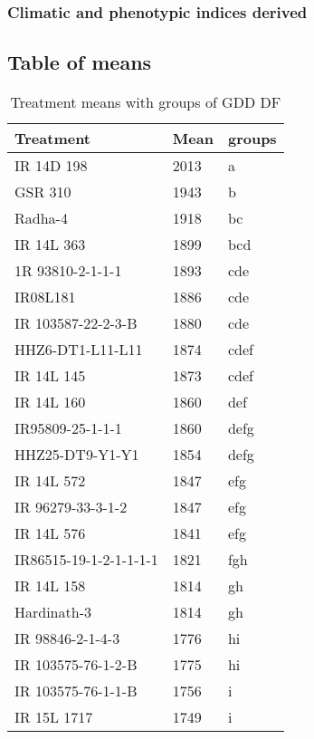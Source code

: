 \documentclass[]{article}
\begin{document}
\subsubsection{Climatic and phenotypic indices
derived}\label{climatic-and-phenotypic-indices-derived}

\subsection{Table of means}\label{table-of-means-1}

\begingroup\fontsize{12}{14}\selectfont

\begin{longtable}{lll}
\caption{\label{tab:two-fac-groups-tab-agroclimate-early}Treatment means with groups of GDD DF}\\
\toprule
Treatment & Mean & groups\\
\midrule
\rowcolor{gray!6}  IR 14D 198 & 2013 & a\\
GSR 310 & 1943 & b\\
\rowcolor{gray!6}  Radha-4 & 1918 & bc\\
IR 14L 363 & 1899 & bcd\\
\rowcolor{gray!6}  1R 93810-2-1-1-1 & 1893 & cde\\
\addlinespace
IR08L181 & 1886 & cde\\
\rowcolor{gray!6}  IR 103587-22-2-3-B & 1880 & cde\\
HHZ6-DT1-L11-L11 & 1874 & cdef\\
\rowcolor{gray!6}  IR 14L 145 & 1873 & cdef\\
IR 14L 160 & 1860 & def\\
\addlinespace
\rowcolor{gray!6}  IR95809-25-1-1-1 & 1860 & defg\\
HHZ25-DT9-Y1-Y1 & 1854 & defg\\
\rowcolor{gray!6}  IR 14L 572 & 1847 & efg\\
IR 96279-33-3-1-2 & 1847 & efg\\
\rowcolor{gray!6}  IR 14L 576 & 1841 & efg\\
\addlinespace
IR86515-19-1-2-1-1-1-1 & 1821 & fgh\\
\rowcolor{gray!6}  IR 14L 158 & 1814 & gh\\
Hardinath-3 & 1814 & gh\\
\rowcolor{gray!6}  IR 98846-2-1-4-3 & 1776 & hi\\
IR 103575-76-1-2-B & 1775 & hi\\
\addlinespace
\rowcolor{gray!6}  IR 103575-76-1-1-B & 1756 & i\\
IR 15L 1717 & 1749 & i\\
\bottomrule
\end{longtable}
\end{document}
